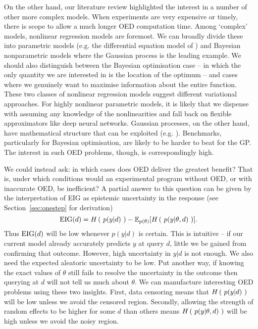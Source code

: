 On the other hand, our literature review highlighted the interest in a number of other more complex models. When experiments are very expensive or timely, there is scope to allow a much longer OED computation time. Among `complex' models, nonlinear regression models are foremost. We can broadly divide these into parametric models (e.g. the differential equation model of \cite{vanlier2012}) and Bayesian nonparametric models where the Gaussian process is the leading example. We should also distinguish between the Bayesian optimisation case --  in which the only quantity we are interested in is the location of the optimum -- and cases where we genuinely want to maximise information about the entire function. These two classes of nonlinear regression models suggest different variational approaches. For highly nonlinear parametric models, it is likely that we dispense with assuming any knowledge of the nonlinearities and fall back on flexible approximators like deep neural networks. Gaussian processes, on the other hand, have mathematical structure that can be exploited (e.g. \cite{pes}). Benchmarks, particularly for Bayesian optimisation, are likely to be harder to beat for the GP. The interest in such OED problems, though, is correspondingly high.

We could instead ask: in which cases does OED deliver the greatest benefit? That is, under which conditions would an experimental program without OED, or with inaccurate OED, be inefficient? A partial answer to this question can be given by the interpretation of EIG as epistemic uncertainty in the response (see Section~\ref{sec:onestep} for derivation)
\begin{equation}
	\text{EIG}(d) = H\left(\ p(y|d)\ \right) - \mathbb{E}_{p(\theta)}[H\left(\ p(y|\theta,d)\ \right)].
\end{equation}
Thus $\text{EIG}(d)$ will be low whenever $p(y|d)$ is certain. This is intuitive -- if our current model already accurately predicts $y$ at query $d$, little we be gained from confirming that outcome. However, high uncertainty in $y|d$ is not enough. We also need the expected aleatoric uncertainty to be low. Put another way, if knowing the exact values of $\theta$ still fails to resolve the uncertainty in the outcome then querying at $d$ will not tell us much about $\theta$. We can manufacture interesting OED problems using these two insights. First, data censoring means that $H\left(\ p(y|d)\ \right)$ will be low unless we avoid the censored region. Secondly, allowing the strength of random effects to be higher for some $d$ than others means $H\left(\ p(y|\theta,d)\ \right)$ will be high unless we avoid the noisy region.

